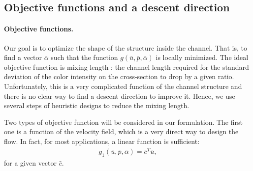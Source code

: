\documentclass[times]{fldauth}
\begin{document}
\subsection{Objective functions and a descent direction}

\paragraph{Objective functions.}
Our goal is to optimize the shape of the structure inside the channel.
That is, to find a vector $\bar{\alpha}$ such that the function
$g(\bar{u},\bar{p},\bar{\alpha})$ is locally minimized. The ideal
objective function is mixing length \cite{Stroock2002}: the channel
length required for the standard deviation of the color intensity on
the cross-section to drop by a given ratio. Unfortunately, this is a
very complicated function of the channel structure and there is no
clear way to find a descent direction to improve it. Hence, we use
several steps of heuristic designs to reduce the mixing length.

Two types of objective function will be considered in our
formulation. The first one is a function of the velocity field, which
is a very direct way to design the flow. In fact, for most
applications, a linear function is sufficient:
\begin{align}
  \label{g1}
  g_1(\bar{u},\bar{p},\bar{\alpha}) = \bar{c}^T\bar{u},
\end{align}
for a given vector $\bar{c}$.
\end{document}
